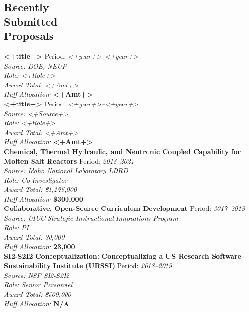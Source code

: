 \documentclass[margin,line]{resume}
\begin{document}
\begin{resume}
    \section{\mysidestyle Recently\\Submitted\\Proposals}
    \textbf{<+title+>} \hfill Period: \textsl{<+year+>--<+year+>}\\
                \hfill \textsl{Source: DOE, NEUP}\\
                \hfill \textsl{Role: <+Role+>}\\
                \hfill \textsl{Award Total: <+Amt+>}\\
                \hfill \textsl{Huff Allocation:} \textbf{<+Amt+>}\\
    \textbf{<+title+>} \hfill Period: \textsl{<+year+>--<+year+>}\\
                \hfill \textsl{Source: <+Source+>}\\
                \hfill \textsl{Role: <+Role+>}\\
                \hfill \textsl{Award Total: <+Amt+>}\\
                \hfill \textsl{Huff Allocation:} \textbf{<+Amt+>}\\
    \textbf{Chemical, Thermal Hydraulic, and Neutronic Coupled Capability for Molten Salt Reactors} \hfill Period: \textsl{2018--2021}\\
                \hfill \textsl{Source: Idaho National Laboratory LDRD}\\
                \hfill \textsl{Role: Co-Investigator}\\
                \hfill \textsl{Award Total: \$1,125,000}\\
                \hfill \textsl{Huff Allocation:} \textbf{\$300,000}\\
    \textbf{Collaborative, Open-Source Curriculum Development} \hfill Period: \textsl{2017--2018}\\
                \hfill \textsl{Source: UIUC Strategic Instructional Innovations Program}\\
                \hfill \textsl{Role: PI}\\
                \hfill \textsl{Award Total: 30,000}\\
                \hfill \textsl{Huff Allocation:} \textbf{23,000}\\
    \textbf{SI2-S2I2 Conceptualization: Conceptualizing a US Research Software Sustainability Institute (URSSI)} \hfill Period: \textsl{2018--2019}\\
                \hfill \textsl{Source: NSF SI2-S2I2}\\
                \hfill \textsl{Role: Senior Personnel}\\
                \hfill \textsl{Award Total: \$500,000}\\
                \hfill \textsl{Huff Allocation:} \textbf{N/A}\\


\end{resume}
\end{document}
